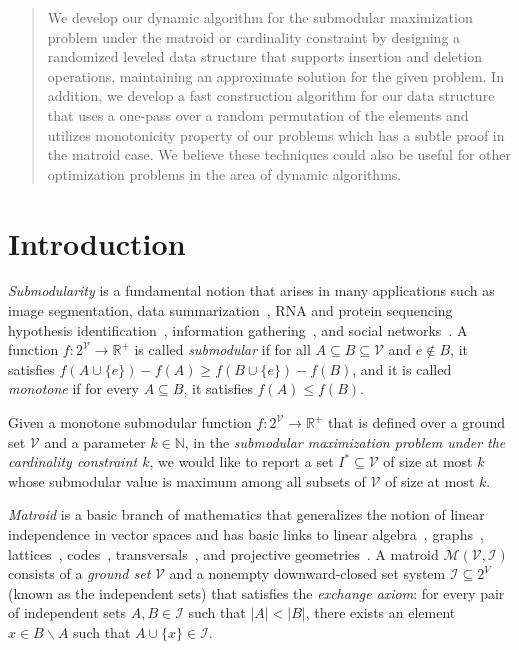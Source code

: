 \documentclass[11pt]{article}
\newcommand{\REAL}{\ensuremath{\mathbb{R}}}
\newcommand{\matroid}{\mathcal{M}(\ground,\mathcal{I})}
\newcommand{\ground}{\ensuremath{\mathcal{V}}}
\begin{document}
\begin{abstract}
{We develop our dynamic algorithm for the submodular maximization problem under the matroid or cardinality constraint by designing a randomized leveled data structure that supports insertion and deletion operations, maintaining an approximate solution for the given problem. In addition, we develop a fast construction algorithm for our data structure that uses a one-pass over a random permutation of the elements and utilizes monotonicity property of our problems which has a subtle proof in the matroid case. We believe these techniques could also be useful for other optimization problems in the area of dynamic algorithms.}

\end{abstract}


\section{Introduction}

\emph{Submodularity} is a fundamental notion
that arises in many applications such as image segmentation, data summarization~\cite{DBLP:conf/aaai/KumariB21,DBLP:journals/jmlr/SchreiberBN20}, 
RNA and protein sequencing~\cite{DBLP:conf/bcb/YangBN20,DBLP:conf/bcb/LibbrechtBN18}
hypothesis identification~\cite{DBLP:journals/pami/BarinovaLK12,DBLP:conf/icml/ChenSMKWK14}, 
information gathering~\cite{DBLP:conf/aaai/RadanovicS0F18}, and
social networks~\cite{DBLP:conf/kdd/KempeKT03}. 
A function $f: 2^\ground \rightarrow \REAL^+$  is called \emph{submodular}  if for all $A \subseteq B \subseteq \ground$ and $e \notin B$, 
it satisfies $f(A \cup \{e\}) -f(A) \ge f(B \cup \{e\}) -f(B)$, and it is called \emph{monotone} if for every $A \subseteq B$, it satisfies $f(A) \leq f(B)$.

Given a monotone submodular function  $f: 2^{\ground} \rightarrow \REAL^+$
that is defined over 
a ground set $\ground$ and a parameter $k \in \mathbb{N}$, 
in the \emph{submodular maximization problem under the cardinality constraint $k$}, 
we would like to report a set $I^* \subseteq \ground$ of size at most $k$ whose 
submodular value is maximum among all subsets of $\ground$ of size at most $k$.


\emph{Matroid} \cite{DBLP:books/daglib/0070636} is a basic branch of mathematics 
that generalizes the notion of linear independence in vector spaces and 
has basic links to linear algebra~\cite{10.2307/24901346}, graphs~\cite{DBLP:journals/mp/Edmonds71}, lattices~\cite{Maeda1970}, codes~\cite{4557271}, transversals~\cite{Edmonds1965TransversalsAM}, and projective geometries~\cite{10.2307/2371070}. 
A matroid $\matroid$ consists of a \emph{ground set} $\ground$ and  
a nonempty downward-closed set system $\mathcal{I} \subseteq 2^{V}$  (known as the independent sets)
that satisfies the \emph{exchange axiom}: 
for every pair of independent sets $A,B \in \mathcal{I}$ such that $|A| < |B| $, 
there exists an element $x\in B\backslash A$ such that $A \cup \{x\} \in \mathcal{I}$. 
\end{document}
